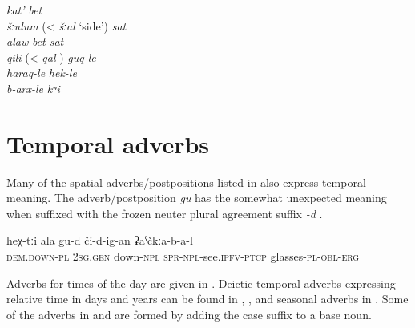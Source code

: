 \begin{exe}
	\ex	\label{ex:adjectivesWithKAt}
		\TabPositions{14em}
		\textit{kat'} 					\tab	\textit{bet}	 \\
		\textit{šːulum}  (< \textit{šːal} `side')			\tab	\textit{sat}  \\
		\textit{alaw} 			\tab	\textit{bet-sat}  \\
		\textit{qili}  (< \textit{qal} )  \tab \textit{guq-le}  \\
		\textit{haraq-le} 					\tab	\textit{hek-le}   \\
		\textit{b-arx-le}  			\tab	\textit{kʷi}  \\
\end{exe}



\section{Temporal adverbs}
\label{sec:TemporalAdverbs}

Many of the spatial adverbs/postpositions listed in  also express temporal meaning. The adverb/postposition \textit{gu} has the somewhat unexpected meaning  when suffixed with the frozen neuter plural agreement suffix \textit{-d} .

\begin{exe}
	\ex	\label{ex:with these glasses of yours with which you were seeing before}
	\gll	heχ-tːi	ala	gu-d	či-d-ig-an	ʡaˁčkːa-b-a-l\\
		\textsc{dem.down}-\textsc{pl}	2\textsc{sg}.\textsc{gen}	down-\textsc{npl}	\textsc{spr}-\textsc{npl}-see.\textsc{ipfv}-\textsc{ptcp}	glasses-\textsc{pl}-\textsc{obl}-\textsc{erg}\\
	\glt	{}
\end{exe}

Adverbs for times of the day are given in . Deictic temporal adverbs expressing relative time in days and years can be found in , , and seasonal adverbs in . Some of the adverbs in  and  are formed by adding the  case suffix to a base noun.

